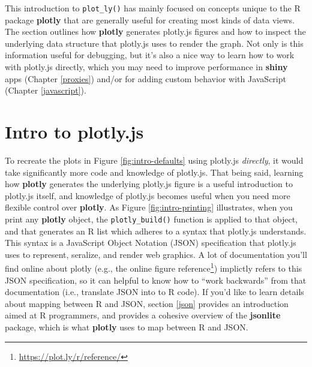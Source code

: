 \documentclass[
  12pt,
]{krantz}
\renewcommand{\href}[2]{#2\footnote{\url{#1}}}
\begin{document}
This introduction to \texttt{plot\_ly()} has mainly focused on concepts unique to the R package \textbf{plotly} that are generally useful for creating most kinds of data views. The section outlines how \textbf{plotly} generates plotly.js figures and how to inspect the underlying data structure that plotly.js uses to render the graph. Not only is this information useful for debugging, but it's also a nice way to learn how to work with plotly.js directly, which you may need to improve performance in \textbf{shiny} apps (Chapter \ref{proxies}) and/or for adding custom behavior with JavaScript (Chapter \ref{javascript}).

\hypertarget{intro-plotly-js}{%
\section{Intro to plotly.js}\label{intro-plotly-js}}

To recreate the plots in Figure \ref{fig:intro-defaults} using plotly.js \emph{directly}, it would take significantly more code and knowledge of plotly.js. That being said, learning how \textbf{plotly} generates the underlying plotly.js figure is a useful introduction to plotly.js itself, and knowledge of plotly.js becomes useful when you need more flexible control over \textbf{plotly}. As Figure \ref{fig:intro-printing} illustrates, when you print any \textbf{plotly} object, the \texttt{plotly\_build()} function is applied to that object, and that generates an R list which adheres to a syntax that plotly.js understands. This syntax is a JavaScript Object Notation (JSON) specification that plotly.js uses to represent, seralize, and render web graphics. A lot of documentation you'll find online about plotly (e.g., the online \href{https://plot.ly/r/reference/}{figure reference}) implictly refers to this JSON specification, so it can helpful to know how to ``work backwards'' from that documentation (i.e., translate JSON into to R code). If you'd like to learn details about mapping between R and JSON, section \ref{json} provides an introduction aimed at R programmers, and \citet{jsonlite} provides a cohesive overview of the \textbf{jsonlite} package, which is what \textbf{plotly} uses to map between R and JSON.
\end{document}
